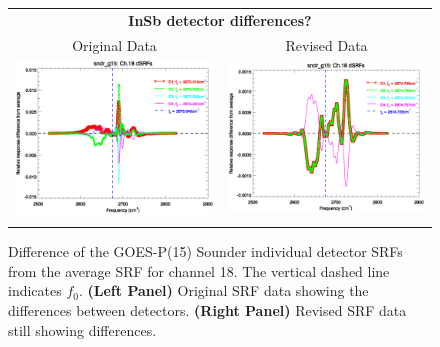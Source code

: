 \begin{figure}[htp]
  \centering
  \begin{tabular}{c c}
    \multicolumn{2}{c}{\textsf{\bfseries InSb detector differences?}} \\
    \hspace{1.5em}\textsf{Original Data} &
    \hspace{1.5em}\textsf{Revised Data} \\
    \includegraphics[scale=0.5,trim=0 40 0 0]{graphics/dsrf_anomaly/original/sndr_g15.ch18.srf.eps} &
    \includegraphics[scale=0.5,trim=0 40 0 0]{graphics/dsrf_anomaly/revised/sndr_g15.ch18.srf.eps} \\\\
  \end{tabular}
  \caption{Difference of the GOES-P(15) Sounder individual detector SRFs from the average SRF for channel 18. The vertical dashed line indicates $f_0$. \textbf{(Left Panel)} Original SRF data showing the differences between detectors. \textbf{(Right Panel)} Revised SRF data still showing differences.}
  \label{fig:sndr_g15.ch18.dsrf_anomaly}
\end{figure}



